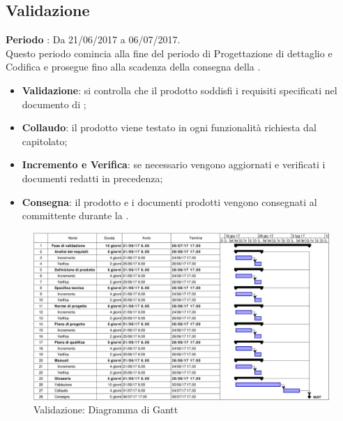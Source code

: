 \documentclass[../PianoDiProgetto.tex]{subfiles}
\begin{document}
		\subsection{Validazione}
		\textbf{Periodo} : Da 21/06/2017 a 06/07/2017. \\
		Questo periodo comincia alla fine del periodo di Progettazione di dettaglio e Codifica e prosegue fino alla scadenza della consegna della \revisionediaccettazione.
		\begin{itemize}
			\item \textbf{Validazione}: si controlla che il prodotto soddisfi i requisiti specificati nel documento di \analisideirequisiti ;
			\item \textbf{Collaudo}: il prodotto viene testato in ogni funzionalità richiesta dal capitolato;
			\item \textbf{Incremento e Verifica}: se necessario vengono aggiornati e verificati i documenti redatti in precedenza;
			\item \textbf{Consegna}: il prodotto e i documenti prodotti vengono consegnati al committente durante la \revisionediaccettazione.
		\end{itemize}
		\begin{figure}[H]
			\centering
			\includegraphics[scale=0.55]{Figures/Gantt_Validazione.jpg}
			\caption{Validazione: Diagramma di Gantt}
		\end{figure}
			
\end{document}
